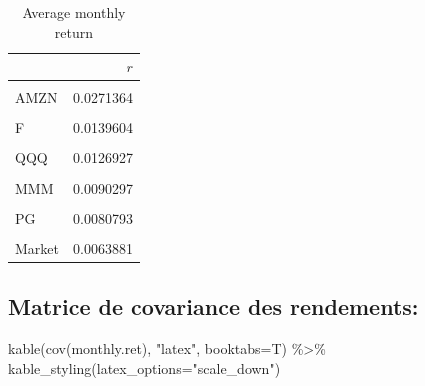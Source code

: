 \documentclass[
]{article}
\newenvironment{Shaded}{\begin{snugshade}}{\end{snugshade}}
\newcommand{\AttributeTok}[1]{\textcolor[rgb]{0.77,0.63,0.00}{#1}}
\newcommand{\FunctionTok}[1]{\textcolor[rgb]{0.00,0.00,0.00}{#1}}
\newcommand{\NormalTok}[1]{#1}
\newcommand{\SpecialCharTok}[1]{\textcolor[rgb]{0.00,0.00,0.00}{#1}}
\newcommand{\StringTok}[1]{\textcolor[rgb]{0.31,0.60,0.02}{#1}}
\begin{document}
\begin{table}[H]

\caption{\label{tab:unnamed-chunk-3}Average monthly return}
\centering
\begin{tabular}[t]{lr}
\toprule
  & $r$\\
\midrule
\cellcolor{gray!6}{AAPL} & \cellcolor{gray!6}{0.0220532}\\
AMZN & 0.0271364\\
\cellcolor{gray!6}{MSFT} & \cellcolor{gray!6}{0.0169185}\\
F & 0.0139604\\
\cellcolor{gray!6}{SPY} & \cellcolor{gray!6}{0.0086184}\\
\addlinespace
QQQ & 0.0126927\\
\cellcolor{gray!6}{XOM} & \cellcolor{gray!6}{0.0012265}\\
MMM & 0.0090297\\
\cellcolor{gray!6}{HD} & \cellcolor{gray!6}{0.0191698}\\
PG & 0.0080793\\
\addlinespace
\cellcolor{gray!6}{KO} & \cellcolor{gray!6}{0.0096675}\\
Market & 0.0063881\\
\bottomrule
\end{tabular}
\end{table}

\hypertarget{matrice-de-covariance-des-rendements}{%
\subsection{Matrice de covariance des
rendements:}\label{matrice-de-covariance-des-rendements}}

\begin{Shaded}
\begin{Highlighting}[]
\FunctionTok{kable}\NormalTok{(}\FunctionTok{cov}\NormalTok{(monthly.ret), }\StringTok{"latex"}\NormalTok{, }\AttributeTok{booktabs=}\NormalTok{T) }\SpecialCharTok{\%\textgreater{}\%}
\FunctionTok{kable\_styling}\NormalTok{(}\AttributeTok{latex\_options=}\StringTok{"scale\_down"}\NormalTok{)}
\end{Highlighting}
\end{Shaded}
\end{document}
